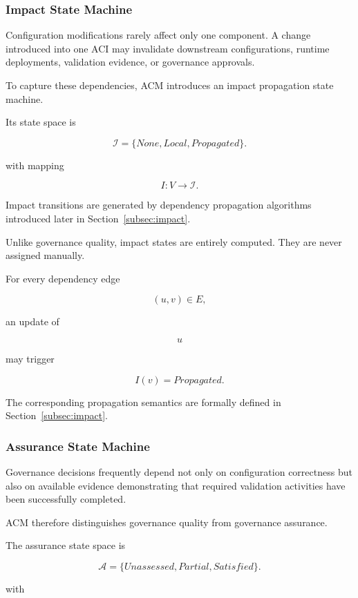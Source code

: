 \documentclass[10pt]{article}
\begin{document}
\subsubsection{Impact State Machine}

Configuration modifications rarely affect only one component.
A change introduced into one ACI may invalidate downstream configurations,
runtime deployments, validation evidence, or governance approvals.

To capture these dependencies, ACM introduces an impact propagation state
machine.

Its state space is

\[
\mathcal{I}
=
\{
None,
Local,
Propagated
\}.
\]

with mapping

\[
I
:
V
\rightarrow
\mathcal{I}.
\]

Impact transitions are generated by dependency propagation algorithms
introduced later in Section~\ref{subsec:impact}.

Unlike governance quality, impact states are entirely computed.
They are never assigned manually.

For every dependency edge

\[
(u,v)\in E,
\]

an update of

\[
u
\]

may trigger

\[
I(v)=Propagated.
\]

The corresponding propagation semantics are formally defined in
Section~\ref{subsec:impact}.

\subsubsection{Assurance State Machine}

Governance decisions frequently depend not only on configuration correctness
but also on available evidence demonstrating that required validation
activities have been successfully completed.

ACM therefore distinguishes governance quality from governance assurance.

The assurance state space is

\[
\mathcal{A}
=
\{
Unassessed,
Partial,
Satisfied
\}.
\]

with
\end{document}
